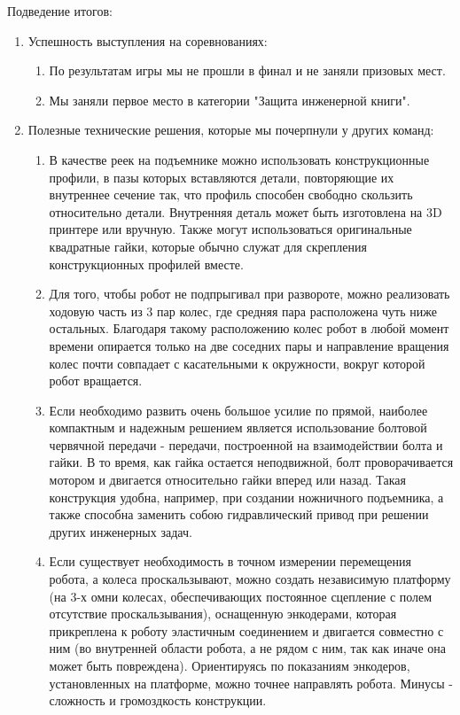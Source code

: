 Подведение итогов:
\begin{enumerate}
  \item Успешность выступления на соревнованиях:
  \begin{enumerate}
	\item По результатам игры мы не прошли в финал и не заняли призовых мест.
	
	\item Мы заняли первое место в категории "Защита инженерной книги".
	
  \end{enumerate}
  
  \item Полезные технические решения, которые мы почерпнули у других команд:
  \begin{enumerate}
  	
	\item В качестве реек на подъемнике можно использовать конструкционные профили, в пазы которых вставляются детали, повторяющие их внутреннее сечение так, что профиль способен свободно скользить относительно детали. Внутренняя деталь может быть изготовлена на 3D принтере или вручную. Также могут использоваться оригинальные квадратные гайки, которые обычно служат для скрепления конструкционных профилей вместе.
	
	\item Для того, чтобы робот не подпрыгивал при развороте, можно реализовать ходовую часть из 3 пар колес, где средняя пара расположена чуть ниже остальных. Благодаря такому расположению колес робот в любой момент времени опирается только на две соседних пары и направление вращения колес почти совпадает с касательными к окружности, вокруг которой робот вращается.
	
	\item Если необходимо развить очень большое усилие по прямой, наиболее компактным и надежным решением является использование болтовой червячной передачи - передачи, построенной на взаимодействии болта и гайки. В то время, как гайка остается неподвижной, болт проворачивается мотором и двигается относительно гайки вперед или назад. Такая конструкция удобна, например, при создании ножничного подъемника, а также способна заменить собою гидравлический привод при решении других инженерных задач.
	
	\item Если существует необходимость в точном измерении перемещения робота, а колеса проскальзывают, можно создать независимую платформу (на 3-х омни колесах, обеспечивающих постоянное сцепление с полем отсутствие проскальзывания), оснащенную энкодерами, которая прикреплена к роботу эластичным соединением и двигается совместно с ним (во внутренней области робота, а не рядом с ним, так как иначе она может быть повреждена). Ориентируясь по показаниям энкодеров, установленных на платформе, можно точнее направлять робота. Минусы - сложность и громоздкость конструкции.
	

\end{enumerate}
\end{enumerate}
